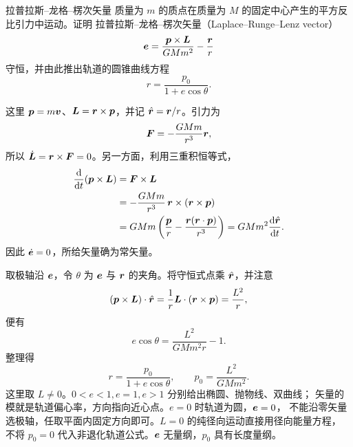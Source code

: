 \begin{origexamplebox}{拉普拉斯--龙格--楞次矢量}
\label{ch11:ex:05}
质量为 $m$ 的质点在质量为 $M$ 的固定中心产生的平方反比引力中运动。证明
拉普拉斯--龙格--楞次矢量（Laplace--Runge--Lenz vector）
\[
 \bm{e}=\frac{\bm{p}\times\bm{L}}{GMm^2}-\frac{\bm{r}}{r}
\]
守恒，并由此推出轨道的圆锥曲线方程
\[
 r=\frac{p_0}{1+e\cos\theta}.
\]

\ThQLRL
\end{origexamplebox}
\begin{xesolution}
\ThALRL

这里 $\bm{p}=m\bm{v}$、$\bm{L}=\bm{r}\times\bm{p}$，并记
$\hat{\bm{r}}=\bm{r}/r$。引力为
\[
 \bm{F}=-\frac{GMm}{r^3}\bm{r},
\]
所以 $\dot{\bm{L}}=\bm{r}\times\bm{F}=0$。另一方面，利用三重积恒等式，
\begin{align*}
 \frac{\mathop{}\!\mathrm d}{\mathop{}\!\mathrm d t}(\bm{p}\times\bm{L})
 &=\bm{F}\times\bm{L}\\
 &=-\frac{GMm}{r^3}\,
   \bm{r}\times(\bm{r}\times\bm{p})\\
 &=GMm\left(\frac{\bm{p}}{r}
 -\frac{\bm{r}(\bm{r}\cdot\bm{p})}{r^3}\right)
 =GMm^2\frac{\mathop{}\!\mathrm d\hat{\bm{r}}}{\mathop{}\!\mathrm d t}.
\end{align*}
因此 $\dot{\bm{e}}=0$，所给矢量确为常矢量。

取极轴沿 $\bm{e}$，令 $\theta$ 为 $\bm{e}$ 与 $\bm{r}$ 的夹角。将守恒式点乘 $\hat{\bm{r}}$，并注意
\[
 (\bm{p}\times\bm{L})\cdot\hat{\bm{r}}
 =\frac1r\bm{L}\cdot(\bm{r}\times\bm{p})=\frac{L^2}{r},
\]
便有
\[
 e\cos\theta=\frac{L^2}{GMm^2r}-1.
\]
整理得
\[
 \boxed{r=\frac{p_0}{1+e\cos\theta}},
 \qquad
 \boxed{p_0=\frac{L^2}{GMm^2}}.
\]
这里取 $L\ne0$。$0<e<1,e=1,e>1$ 分别给出椭圆、抛物线、双曲线；
矢量的模就是轨道偏心率，方向指向近心点。$e=0$ 时轨道为圆，$\bm{e}=0$，
不能沿零矢量选极轴，任取平面内固定方向即可。$L=0$ 的纯径向运动直接用径向能量方程，
不将 $p_0=0$ 代入非退化轨道公式。$\bm{e}$ 无量纲，$p_0$ 具有长度量纲。
\end{xesolution}

